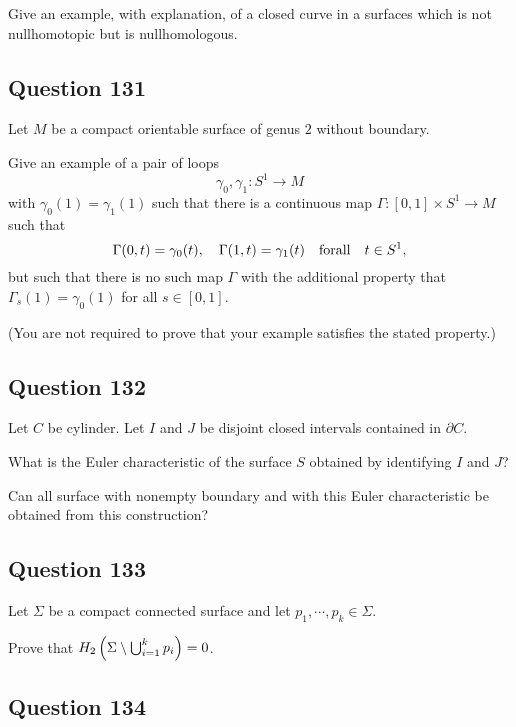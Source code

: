 \documentclass[12pt]{article}
\newcommand{\qty}[1]{\left( {#1} \right)}
\begin{document}
Give an example, with explanation, of a closed curve in a surfaces which
is not nullhomotopic but is nullhomologous.

\hypertarget{question-131-1}{%
\subsection{Question 131}\label{question-131-1}}

Let \(M\) be a compact orientable surface of genus \(2\) without
boundary.

Give an example of a pair of loops \[\gamma_0 , \gamma_1 : S^1 \to M\]
with \(\gamma_0 (1) = \gamma_1 (1)\) such that there is a continuous map
\(\Gamma: [0, 1] \times S^1 \to M\) such that \[
\Gamma(0, t) = \gamma_0 (t), \quad \Gamma(1, t) = \gamma_1 (t) {\quad \operatorname{for all} \quad} t \in S^1
,\] but such that there is no such map \(\Gamma\) with the additional
property that \(\Gamma_s (1) = \gamma_0 (1)\) for all \(s \in [0, 1]\).

(You are not required to prove that your example satisfies the stated
property.)

\hypertarget{question-132-1}{%
\subsection{Question 132}\label{question-132-1}}

Let \(C\) be cylinder. Let \(I\) and \(J\) be disjoint closed intervals
contained in \(\partial C\).

What is the Euler characteristic of the surface \(S\) obtained by
identifying \(I\) and \(J\)?

Can all surface with nonempty boundary and with this Euler
characteristic be obtained from this construction?

\hypertarget{question-133-1}{%
\subsection{Question 133}\label{question-133-1}}

Let \(\Sigma\) be a compact connected surface and let
\(p_1, \cdots , p_k \in \Sigma\).

Prove that \(H_2 \qty{\Sigma \setminus \union_{i=1}^k {p_i} } = 0\).

\hypertarget{question-134-1}{%
\subsection{Question 134}\label{question-134-1}}
\end{document}
